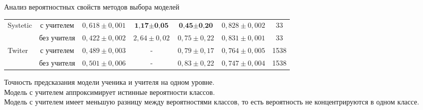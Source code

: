 \documentclass[10pt,pdf,hyperref={unicode}]{beamer}
\begin{document}
\begin{frame}{Анализ вероятностных свойств методов выбора моделей}
\begin{table}[]
\begin{center}
{\begin{tabular}{|l|c|c|c|c|c|c|}
\multirow{2}{*}{Systetic}     & с учителем  & $0{,}618\pm0{,}001$                                                & $\textbf{1{,}17}\pm\textbf{0{,}05}$                                                                             & $\textbf{0{,}45}\pm\textbf{0{,}20}$                                               & $0{,}828\pm0{,}002$ & 33                                                         \\ \cline{2-7} 
                              & без учителя & $0{,}422\pm0{,}002$                                                & $2{,}64\pm0{,}02$                                                                             & $0{,}75\pm0{,}22$                                               & $0{,}831\pm0{,}001$ & 33                                                         \\ \hline \hline
\multirow{2}{*}{Twiter}       & с учителем  & $0{,}489\pm0{,}003$                                               & -                                                                                             & $0{,}79\pm0{,}17$                                               & $0{,}764\pm0{,}005$ & 1538                                                       \\ \cline{2-7} 
                              & без учителя &  $0{,}501\pm0{,}006$                                                & -                                                                                             & $0{,}83\pm0{,}22$                                               & $0{,}747\pm0{,}004$ & 1538                                                       \\ \hline 
\end{tabular}
}
\end{center}
\end{table}

Точность предсказания модели ученика и учителя на одном уровне.\\
{\color{blue}Модель с учителем аппроксимирует истинные вероятности классов.}\\
{\color{red}Модель с учителем имеет меньшую разницу между вероятностями классов, то есть вероятность не концентрируются в одном классе.}
\end{frame}
\end{document}
